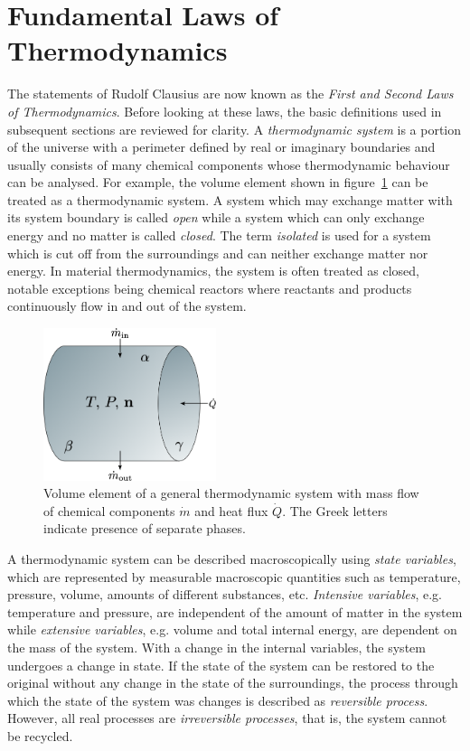 \section{Fundamental Laws of Thermodynamics}
	The statements of Rudolf Clausius are now known as the \emph{First and Second Laws of Thermodynamics}. Before looking at these laws, the basic definitions used in subsequent sections are reviewed for clarity. A \emph{thermodynamic system} is a portion of the universe with a perimeter defined by real or imaginary boundaries and usually consists of many chemical components whose thermodynamic behaviour can be analysed. For example, the volume element shown in figure~\ref{fig:system} can be treated as a thermodynamic system. A system which may exchange matter with its system boundary is called \emph{open} while a system which can only exchange energy and no matter is called \emph{closed}. The term \emph{isolated} is used for a system which is cut off from the surroundings and can neither exchange matter nor energy. In material thermodynamics, the system is often treated as closed, notable exceptions being chemical reactors where reactants and products continuously flow in and out of the system.
 	\begin{figure}[htb]
		\centering
		\includegraphics[width=0.45\textwidth]{figures/chapter-3/system.png}
		\caption{Volume element of a general thermodynamic system with mass flow of chemical components $\dot{m}$ and heat flux $\dot{Q}$. The Greek letters indicate presence of separate phases.}
		\label{fig:system}
	\end{figure}

	A thermodynamic system can be described macroscopically using \emph{state variables}, which are represented by measurable macroscopic quantities such as temperature, pressure, volume, amounts of different substances, etc. \emph{Intensive variables}, e.g. temperature and pressure,  are independent of the amount of matter in the system  while  \emph{extensive variables}, e.g. volume and total internal energy, are dependent on the mass of the system.  With a change in the internal variables, the system undergoes a change in state. If the state of the system can be restored to the original without any change in the state of the surroundings, the process through which the state of the system was changes is described as \emph{reversible process}. However, all real processes are \emph{irreversible processes}, that is, the system cannot be recycled.


